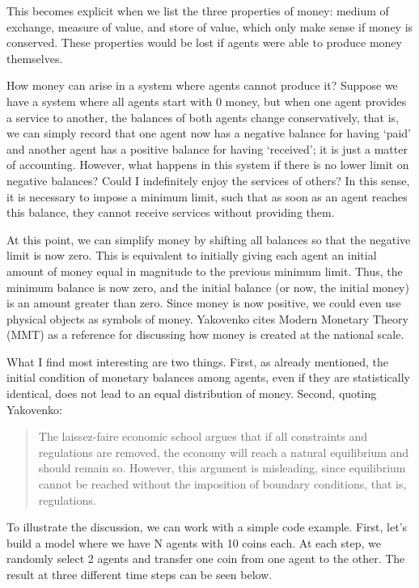 This becomes explicit when we list the three properties of money: medium of exchange, measure of value, and store of value, which only make sense if money is conserved. These properties would be lost if agents were able to produce money themselves.

How money can arise in a system where agents cannot produce it? Suppose we have a system where all agents start with 0 money, but when one agent provides a service to another, the balances of both agents change conservatively, that is, we can simply record that one agent now has a negative balance for having ‘paid’ and another agent has a positive balance for having ‘received’; it is just a matter of accounting. However, what happens in this system if there is no lower limit on negative balances? Could I indefinitely enjoy the services of others? In this sense, it is necessary to impose a minimum limit, such that as soon as an agent reaches this balance, they cannot receive services without providing them.

At this point, we can simplify money by shifting all balances so that the negative limit is now zero. This is equivalent to initially giving each agent an initial amount of money equal in magnitude to the previous minimum limit. Thus, the minimum balance is now zero, and the initial balance (or now, the initial money) is an amount greater than zero. Since money is now positive, we could even use physical objects as symbols of money. Yakovenko cites Modern Monetary Theory (MMT) as a reference for discussing how money is created at the national scale.

What I find most interesting are two things. First, as already mentioned, the initial condition of monetary balances among agents, even if they are statistically identical, does not lead to an equal distribution of money. Second, quoting Yakovenko:

\begin{quote}
The laissez-faire economic school argues that if all constraints and regulations are removed, the economy will reach a natural equilibrium and should remain so. However, this argument is misleading, since equilibrium cannot be reached without the imposition of boundary conditions, that is, regulations.

\end{quote}

To illustrate the discussion, we can work with a simple code example. First, let's build a model where we have N agents with 10 coins each. At each step, we randomly select 2 agents and transfer one coin from one agent to the other. The result at three different time steps can be seen below.

